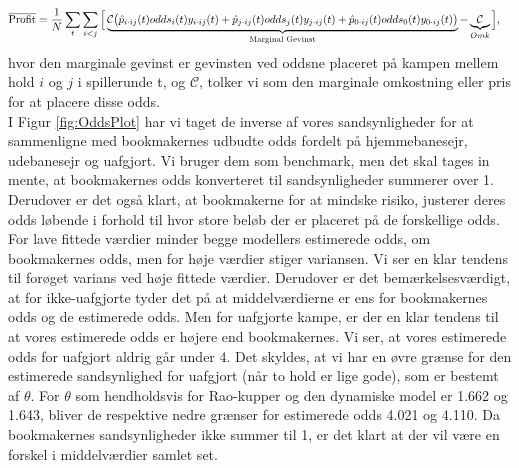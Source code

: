 \documentclass[11pt,a4paper]{article}
\begin{document}
\begin{align}
    \overline{\text{Profit}}&= \frac{1}{N}\sum_t\sum_{i<j}\Big{[} \underbrace{\mathcal{C}\big{(}\hat{p}_{i\cdot ij}(t)odds_i(t)y_{i\cdot ij}(t)+\hat{p}_{j\cdot ij}(t)odds_j(t)y_{j\cdot ij}(t)+\hat{p}_{0\cdot ij}(t)odds_0(t)y_{0\cdot ij}(t)\big{)}}_{\text{Marginal Gevinst}} -\underbrace{\mathcal{C}}_{Omk}\Big{]},\label{func:Profit}
\end{align}
hvor den marginale gevinst er gevinsten ved oddsne placeret på kampen mellem hold $i$ og $j$ i spillerunde t, og $\mathcal{C}$, tolker vi som den marginale omkostning eller pris for at placere disse odds. \\I Figur \ref{fig:OddsPlot} har vi taget de inverse af vores sandsynligheder for at sammenligne med bookmakernes udbudte odds fordelt på hjemmebanesejr, udebanesejr og uafgjort. Vi bruger dem som benchmark, men det skal tages in mente, at bookmakernes odds konverteret til sandsynligheder summerer over 1. Derudover er det også klart, at bookmakerne for at mindske risiko, justerer deres odds løbende i forhold til hvor store beløb der er placeret på de forskellige odds. For lave fittede værdier minder begge modellers estimerede odds, om bookmakernes odds, men for høje værdier stiger variansen. Vi ser en klar tendens til forøget varians ved høje fittede værdier. Derudover er det bemærkelsesværdigt, at for ikke-uafgjorte tyder det på at middelværdierne er ens for bookmakernes odds og de estimerede odds. Men for uafgjorte kampe, er der en klar tendens til at vores estimerede odds er højere end bookmakernes. Vi ser, at vores estimerede odds for uafgjort aldrig går under 4. Det skyldes, at vi har en øvre grænse for den estimerede sandsynlighed for uafgjort (når to hold er lige gode), som er bestemt af $\theta$. For $\theta$ som hendholdsvis for Rao-kupper og den dynamiske model er 1.662 og 1.643, bliver de respektive nedre grænser for estimerede odds 4.021 og 4.110. Da bookmakernes sandsynligheder ikke summer til 1, er det klart at der vil være en forskel i middelværdier samlet set.   
\end{document}
